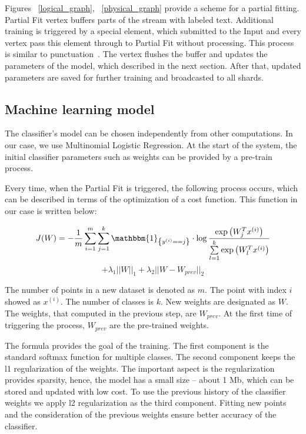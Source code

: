 Figures ~\ref{logical_graph}, ~\ref{physical_graph} provide a scheme for a partial fitting. Partial Fit vertex buffers parts of the stream with labeled text. Additional training is triggered by a special element, which submitted to the Input and every vertex pass this element through to Partial Fit without processing. This process is similar to punctuation~\cite{tucker2003exploiting}. The vertex flushes the buffer and updates the parameters of the model, which described in the next section. After that, updated parameters are saved for further training and broadcasted to all shards.

\subsection{Machine learning model \label{ML}}

The classifier's model can be chosen independently from other computations. In our case, we use Multinomial Logistic Regression. At the start of the system, the initial classifier parameters such as weights can be provided by a pre-train process.

Every time, when the Partial Fit is triggered, the following process occurs, which can be described in terms of the optimization of a cost function. This function in our case is written below:

\begin{center}

$$ J(W) = -\frac{1}{m} \sum \limits_{i = 1}^{m} \sum \limits_{j = 1}^{k} \mathbbm{1}_{\left\{y^{(i)} == j\right\}} \cdot \log \frac{\exp\left({W_{j}^Tx^{(i)}}\right) }{\sum \limits_{l = 1}^{k}  \exp\left({W_{l}^Tx^{(i)}}\right) }$$ 
 $$ +  \lambda_1 ||W||_1 + \lambda_2 ||W - W_{prev}||_2 $$

\end{center} 

The number of points in a new dataset is denoted as $m$. The point with index $i$ showed as $x^{(i)}$. The number of classes is $k$. New weights are designated as $W$. The weights, that computed in the previous step, are $W_{prev}$. At the first time of triggering the process, $W_{prev}$ are the pre-trained weights. 

The formula provides the goal of the training. The first component is the standard softmax function for multiple classes. The second component keeps the l1 regularization of the weights. The important aspect is the regularization provides sparsity, hence, the model has a small size -- about 1 Mb, which can be stored and updated with low cost. To use the previous history of the classifier weights we apply l2 regularization as the third component. Fitting new points and the consideration of the previous weights ensure better accuracy of the classifier.

